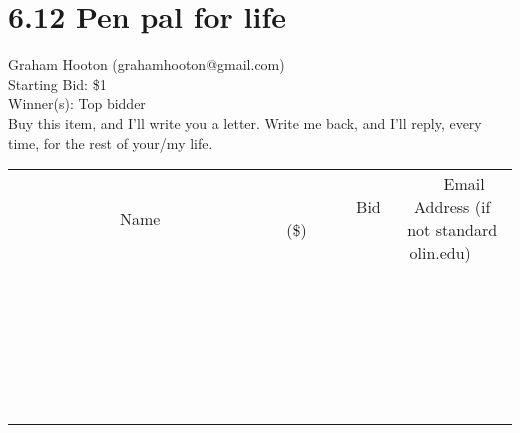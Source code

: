 \documentclass[11pt]{article}
\begin{document}
\section*{6.12 Pen pal for life}
Graham Hooton (grahamhooton@gmail.com) \\
Starting Bid: \$1 \\
Winner(s): 
Top bidder \\
Buy this item, and I’ll write you a letter. Write me back, and I’ll reply, every time, for the rest of your/my life. \\[6ex]
\begin{tabular}{c c c}
~~~~~~~~~~~~~Name~~~~~~~~~~~~~ & ~~~~~~~~~Bid (\$)~~~~~~~~~ & ~~~Email Address (if not standard olin.edu)~~~ \\
 & & \\
\hline
 & & \\
\hline
 & & \\
\hline
 & & \\
\hline
 & & \\
\hline
 & & \\
\hline
 & & \\
\hline
 & & \\
\hline
 & & \\
\hline
 & & \\
\hline
 & & \\
\hline
 & & \\
\hline
 & & \\
\hline
 & & \\
\hline
 & & \\
\hline
 & & \\
\hline
 & & \\
\hline
 & & \\
\hline
 & & \\
\hline
 & & \\
\hline
 & & \\
\hline
 & & \\
\hline
 & & \\
\hline
 & & \\
\hline
 & & \\
\hline
 & & \\
\hline
\end{tabular}
\clearpage
\end{document}
